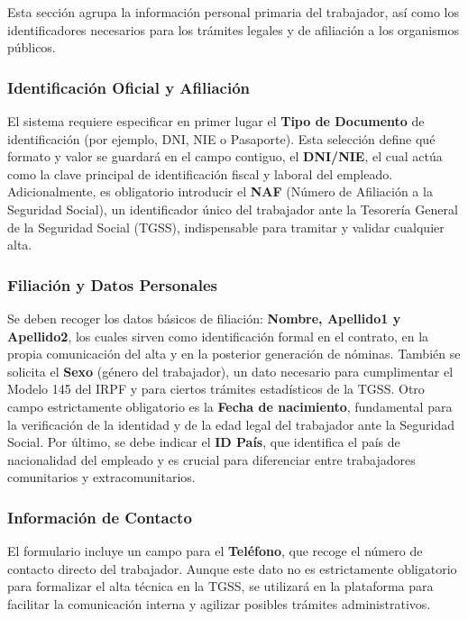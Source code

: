Esta sección agrupa la información personal primaria del trabajador, así como los identificadores necesarios para los trámites legales y de afiliación a los organismos públicos.

\subsubsection{Identificación Oficial y Afiliación} El sistema requiere especificar en primer lugar el \textbf{Tipo de Documento} de identificación (por ejemplo, DNI, NIE o Pasaporte). Esta selección define qué formato y valor se guardará en el campo contiguo, el \textbf{DNI/NIE}, el cual actúa como la clave principal de identificación fiscal y laboral del empleado. Adicionalmente, es obligatorio introducir el \textbf{NAF} (Número de Afiliación a la Seguridad Social), un identificador único del trabajador ante la Tesorería General de la Seguridad Social (TGSS), indispensable para tramitar y validar cualquier alta.

\subsubsection{Filiación y Datos Personales} Se deben recoger los datos básicos de filiación: \textbf{Nombre, Apellido1 y Apellido2}, los cuales sirven como identificación formal en el contrato, en la propia comunicación del alta y en la posterior generación de nóminas. También se solicita el \textbf{Sexo} (género del trabajador), un dato necesario para cumplimentar el Modelo 145 del IRPF y para ciertos trámites estadísticos de la TGSS. Otro campo estrictamente obligatorio es la \textbf{Fecha de nacimiento}, fundamental para la verificación de la identidad y de la edad legal del trabajador ante la Seguridad Social. Por último, se debe indicar el \textbf{ID País}, que identifica el país de nacionalidad del empleado y es crucial para diferenciar entre trabajadores comunitarios y extracomunitarios.

\subsubsection{Información de Contacto} El formulario incluye un campo para el \textbf{Teléfono}, que recoge el número de contacto directo del trabajador. Aunque este dato no es estrictamente obligatorio para formalizar el alta técnica en la TGSS, se utilizará en la plataforma para facilitar la comunicación interna y agilizar posibles trámites administrativos.

